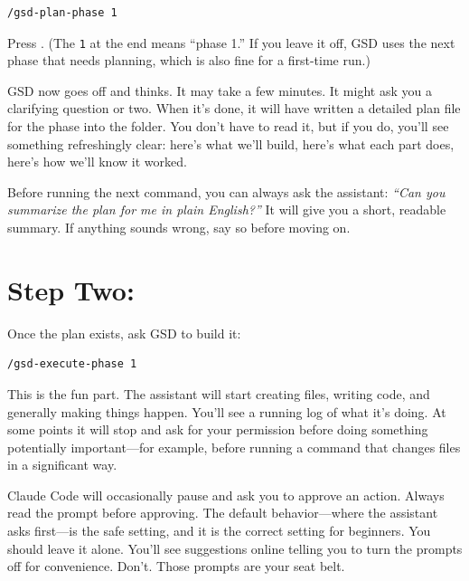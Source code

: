 \documentclass[11pt,letterpaper,openany]{book}
\begin{document}
\begin{lstlisting}
/gsd-plan-phase 1
\end{lstlisting}

Press . (The \texttt{1} at the end means ``phase 1.'' If
you leave it off, GSD uses the next phase that needs planning, which is
also fine for a first-time run.)

GSD now goes off and thinks. It may take a few minutes. It might ask you
a clarifying question or two. When it's done, it will have written a
detailed plan file for the phase into the  folder.
You don't have to read it, but if you do, you'll see something
refreshingly clear: here's what we'll build, here's what each part does,
here's how we'll know it worked.

\begin{gsdtip}
Before running the next command, you can always ask the assistant:
\emph{``Can you summarize the plan for me in plain English?''} It will
give you a short, readable summary. If anything sounds wrong, say so
before moving on.
\end{gsdtip}

\section{Step Two: }

Once the plan exists, ask GSD to build it:

\begin{lstlisting}
/gsd-execute-phase 1
\end{lstlisting}

This is the fun part. The assistant will start creating files, writing
code, and generally making things happen. You'll see a running log of
what it's doing. At some points it will stop and ask for your permission
before doing something potentially important---for example, before
running a command that changes files in a significant way.

\begin{gsdimportant}
Claude Code will occasionally pause and ask you to approve an action.
Always read the prompt before approving. The default behavior---where
the assistant asks first---is the safe setting, and it is the correct
setting for beginners. You should leave it alone. You'll see suggestions
online telling you to turn the prompts off for convenience. Don't. Those
prompts are your seat belt.
\end{gsdimportant}
\end{document}
